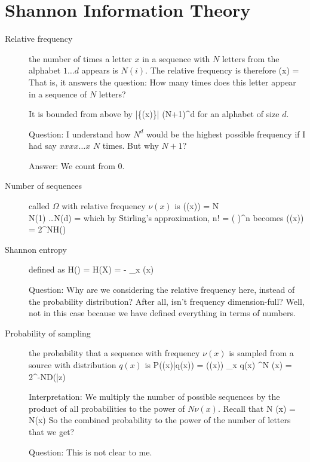 \section{Shannon Information Theory}
\begin{description}

\item[Relative frequency] the number of times a letter $x$ in a sequence with $N$ letters from the alphabet $1\ldots d$ appears is $N(i)$. The relative frequency is therefore 
\beq
\nu(x) = 
\eeq
That is, it answers the question: How many times does this letter appear in a sequence of $N$ letters? 

It is bounded from above by 
\beq
|\{\nu(x)\}| \leq (N+1)^d
\eeq
for an alphabet of size $d$. 

Question: I understand how $N^d$ would be the highest possible frequency if I had say $xxxx\ldots x$ $N$ times. But why $N +1$? 

Answer: We count from 0. 

\item[Number of sequences] called $\Omega$ with relative frequency $\nu(x)$ is 
\beq
\Omega(\nu(x)) = \bpmat N \\ N(1) \ldots N(d) \epmat = 
\eeq
which by Stirling's approximation, 
\beq
n! =  \left(  \right)^n 
\eeq
becomes
\beq
\Omega(\nu(x)) =  2^{NH(\nu)}
\eeq

\item[Shannon entropy] defined as
\beq
H(\nu) = H(X) = - \sum_x \nu(x) 
\eeq

Question: Why are we considering the relative frequency here, instead of the probability distribution?  After all, isn't frequency dimension-full? Well, not in this case because we have defined everything in terms of numbers. 

\item[Probability of sampling] the probability that a sequence with frequency $\nu(x)$ is sampled from a source with distribution $q(x)$ is
\beq
P(\nu(x)|q(x))  = \Omega(\nu(x)) \prod_x q(x) ^{N \nu(x)} = 2^{-ND(\nu|z)}
\eeq

Interpretation: We multiply the number of possible sequences by the product of all probabilities to the power of $N \nu(x)$. Recall that 
\beq
N \nu(x) = N(x)
\eeq
So the combined probability to the power of the number of letters that we get? 

Question: This is not clear to me. 


\end{description}
